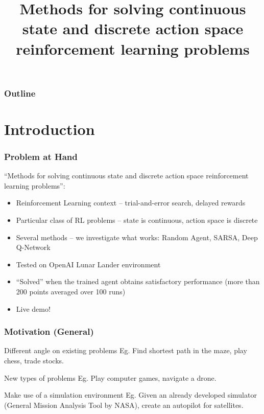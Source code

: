 \documentclass{beamer}
\title[RL Methods]{Methods for solving
	continuous state and discrete action space 
	reinforcement learning problems}
\begin{document}
\begin{frame}
\titlepage %
\end{frame}

\begin{frame}
\frametitle{Outline}

\tableofcontents 

\end{frame}


\section{Introduction} 

\begin{frame}
\frametitle{Problem at Hand}
``Methods for solving
continuous state and discrete action space 
reinforcement learning problems'':

\begin{itemize}
\item Reinforcement Learning context -- trial-and-error search,
delayed rewards
\item Particular class of RL problems -- state is continuous,
action space is discrete 
\item Several methods -- we investigate what 
works: Random Agent, SARSA, Deep Q-Network 
\item Tested on OpenAI Lunar Lander environment
\item ``Solved'' when the trained agent obtains satisfactory 
performance (more than 200 points averaged over 100 runs)
\item Live demo!
\end{itemize}
\end{frame}



\begin{frame}
\frametitle{Motivation (General)}
\begin{block}{Different angle on existing problems}
Eg. Find shortest path in the maze, play chess, trade stocks. 
\end{block}

\begin{block}{New types of problems}
Eg. Play computer games, navigate a drone.
\end{block}

\begin{block}{Make use of a simulation environment}
Eg. Given an already developed 
simulator (General Mission Analysis Tool by NASA), 
create an autopilot 
for satellites.
\end{block}
\end{frame}
\end{document}

